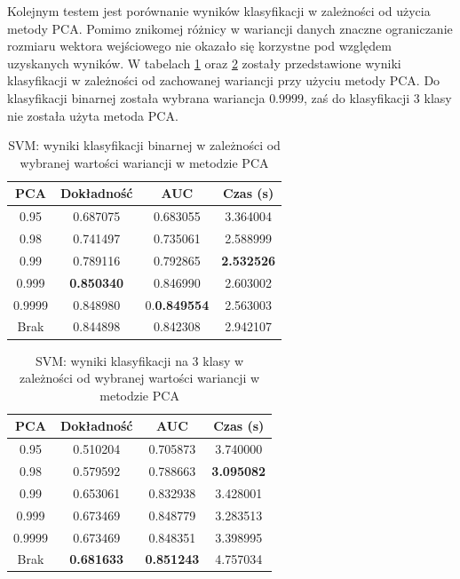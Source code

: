 \documentclass[a4paper, twoside, 11pt, openright]{article}
\begin{document}
Kolejnym testem jest porównanie wyników klasyfikacji w zależności od użycia metody PCA. Pomimo znikomej różnicy w wariancji danych znaczne ograniczanie rozmiaru wektora wejściowego nie okazało się korzystne pod względem uzyskanych wyników. W tabelach \ref{tab:svm_pca_binary} oraz \ref{tab:svm_pca_discrete} zostały przedstawione wyniki klasyfikacji w zależności od zachowanej wariancji przy użyciu metody PCA. Do klasyfikacji binarnej została wybrana wariancja $0.9999$, zaś do klasyfikacji 3 klasy nie została użyta metoda PCA.


\begin{table}[H]
    \centering
    \begin{tabular}{|c|c|c|c|}
    \hline
        \textbf{PCA} & \textbf{Dokładność} &  \textbf{AUC} &  \textbf{Czas (s)} \\ \hline
0.95               &  0.687075 &  0.683055 &    3.364004 \\ \hline
0.98               &  0.741497 &  0.735061 &    2.588999 \\ \hline
0.99               &  0.789116 &  0.792865 &    \textbf{2.532526} \\ \hline
0.999             &  \textbf{0.850340} &  0.846990 &    2.603002 \\ \hline
0.9999             &  0.848980 &  0.\textbf{0.849554} &    2.563003 \\ \hline
Brak                &  0.844898 &  0.842308 &    2.942107 \\ \hline
    \end{tabular}
    \caption{SVM: wyniki klasyfikacji binarnej w zależności od wybranej wartości wariancji w metodzie PCA}
    \label{tab:svm_pca_binary}
\end{table}

\begin{table}[H]
    \centering
    \begin{tabular}{|c|c|c|c|}
    \hline
        \textbf{PCA} & \textbf{Dokładność} &  \textbf{AUC} &  \textbf{Czas (s)} \\ \hline
0.95               &  0.510204 &  0.705873 &    3.740000 \\ \hline
0.98               &  0.579592 &  0.788663 &    \textbf{3.095082} \\ \hline
0.99               &  0.653061 &  0.832938 &    3.428001 \\ \hline
0.999              &  0.673469 &  0.848779 &    3.283513 \\ \hline
0.9999             &  0.673469 &  0.848351 &    3.398995 \\ \hline
Brak               &  \textbf{0.681633} &  \textbf{0.851243} &    4.757034 \\ \hline
    \end{tabular}
    \caption{SVM: wyniki klasyfikacji na 3 klasy w zależności od wybranej wartości wariancji w metodzie PCA}
    \label{tab:svm_pca_discrete}
\end{table}
\end{document}
